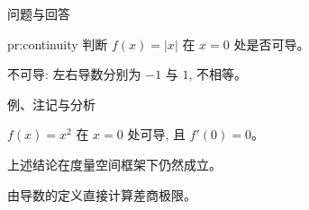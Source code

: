 \begin{frame}{问题与回答}
  \begin{problem}{}{pr:continuity}
    判断 $f(x) = |x|$ 在 $x = 0$ 处是否可导。
  \end{problem}

  \pause

  \begin{answer}
    不可导: 左右导数分别为 $-1$ 与 $1$, 不相等。
  \end{answer}
\end{frame}

\begin{frame}{例、注记与分析}
  \begin{example}{}{}
    $f(x) = x^2$ 在 $x = 0$ 处可导, 且 $f'(0) = 0$。
  \end{example}

  \begin{remark}{}{}
    上述结论在度量空间框架下仍然成立。
  \end{remark}

  \begin{sketch}{}{}
    由导数的定义直接计算差商极限。
  \end{sketch}
\end{frame}
